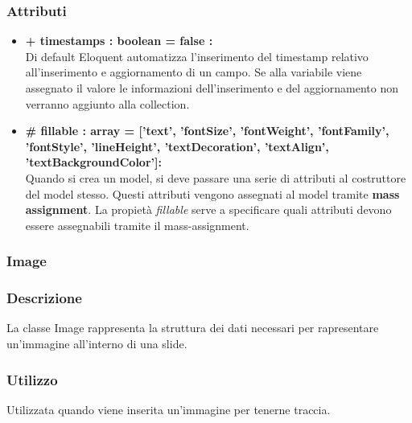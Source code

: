 	\subsubsection*{Attributi}
	\begin{itemize}
		\item \textbf{+ timestamps : boolean = false :}\\
		Di default Eloquent automatizza l'inserimento del timestamp relativo all'inserimento e aggiornamento di un campo. Se alla variabile viene assegnato il valore le informazioni dell'inserimento e del aggiornamento non verranno aggiunto alla collection.
		\item \textbf{\# fillable : array = [’text’, ’fontSize’, ’fontWeight’, ’fontFamily’, ’fontStyle’, ’lineHeight’, ’textDecoration’, ’textAlign’, ’textBackgroundColor']:}\\
		Quando si crea un model, si deve passare una serie di attributi al costruttore del model stesso. Questi attributi vengono assegnati al model tramite \textbf{mass assignment}. La propietà \textit{fillable} serve a specificare quali attributi devono essere assegnabili tramite il mass-assignment.

	\end{itemize}

\newpage
\subsubsection{Image}


	\subsubsection*{Descrizione}
	La classe Image rappresenta la struttura dei dati necessari per rapresentare un’immagine all’interno di una slide.
	
	\subsubsection*{Utilizzo}
	Utilizzata quando viene inserita un’immagine per tenerne traccia.
	
